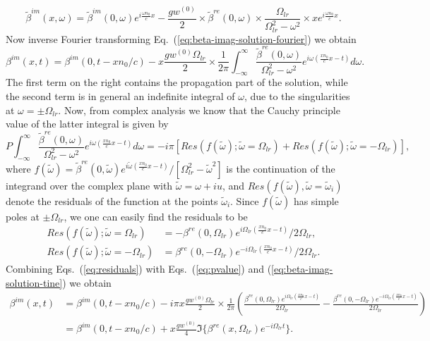 \documentclass[onecolumn,secnumarabic,amssymb, nobibnotes, aip, prd]{revtex4-1}
\def\t{\tilde}
\def\om{\omega}
\begin{document}
\begin{equation}
\label{eq:beta-imag-solution-fourier}
\t\beta^{im}(x,\om) = \t\beta^{im}(0,\om)e^{i\frac{\om n_0}{c}x} -\frac{g w^{(0)} }{2}\times  \t\beta^{re}(0,\om) \times\frac{\Omega_{lr}}{\Omega_{lr}^2-\om^2}\times x e^{i\frac{\om n_0}{c}x}.
\end{equation}
Now inverse Fourier transforming Eq.~(\ref{eq:beta-imag-solution-fourier}) we obtain
\begin{equation}
\label{eq:beta-imag-solution-tine}
\beta^{im}(x,t) = \beta^{im}(0,t-xn_0/c)  -x\frac{g w^{(0)} \Omega_{lr} }{2}\times \frac{1}{2\pi} \int_{-\infty}^{\infty} \frac{\t\beta^{re}(0,\om)}{\Omega_{lr}^2-\om^2} e^{i\om(\frac{x n_0}{c}x-t)}d\omega.
\end{equation}
The first term on the right contains the propagation part of the solution, while the second term is in general an indefinite integral of $\omega$, due to the singularities at $\omega = \pm \Omega_{lr}$. Now, from complex analysis we know that the Cauchy principle value of the latter integral is given by
\begin{equation}
\label{eq:pvalue}
P \int_{-\infty}^{\infty} \frac{\t\beta^{re}(0,\om)}{\Omega_{lr}^2-\om^2} e^{i\om(\frac{x n_0}{c}x-t)}d\omega = -i\pi \left[Res(f(\tilde\omega);\tilde\omega=\Omega_{lr})+Res(f(\tilde\omega);\tilde\omega=-\Omega_{lr})\right],
\end{equation}
where $f(\tilde\omega) = \t\beta^{re}(0,\tilde\omega) e^{i\tilde\omega(\frac{x n_0}{c}x-t)}/[\Omega_{lr}^2-\tilde\omega^2]$ is the continuation of the integrand over the complex plane with $\tilde\omega = \omega + iu$, and $Res(f(\tilde{\omega}),\tilde\omega=\tilde\omega_i)$ denote the residuals of the function at the points $\tilde\omega_i$. Since $f(\tilde\omega)$ has simple poles at $\pm\Omega_{lr}$, we one can easily find the residuals to be 
\begin{subequations}
\label{eq:residuals}
\begin{align}
Res(f(\tilde{\omega});\tilde{\omega}=\Omega_{lr}) &= - \beta^{re}(0,\Omega_{lr})e^{i\Omega_{lr}(\frac{x n_0}{c}x-t)}/2\Omega_{lr}, \\
Res(f(\tilde{\omega});\tilde{\omega}=-\Omega_{lr}) &= \beta^{re}(0,-\Omega_{lr})e^{-i\Omega_{lr}(\frac{x n_0}{c}x-t)}/2\Omega_{lr}.
\end{align}
\end{subequations}
Combining Eqs.~(\ref{eq:residuals}) with Eqs.~(\ref{eq:pvalue}) and (\ref{eq:beta-imag-solution-tine}) we obtain
\begin{subequations}
	\begin{align}
	\beta^{im}(x,t) &= \beta^{im}(0,t-xn_0/c)  -i\pi x\frac{g w^{(0)} \Omega_{lr} }{2}\times  \frac{1}{2\pi} \left( \frac{\beta^{re}(0,\Omega_{lr})e^{i\Omega_{lr}(\frac{x n_0}{c}x-t)}}{2\Omega_{lr}}-\frac{\beta^{re}(0,-\Omega_{lr})e^{-i\Omega_{lr}(\frac{x n_0}{c}x-t)}}{2\Omega_{lr}} \right) \nonumber \\
	&= \beta^{im}(0,t-xn_0/c)+ x\frac{g w^{(0)}}{4}\Im\{ \beta^{re}(x,\Omega_{lr})e^{-i\Omega_{lr}t}\}. 
	\end{align}
\end{subequations}
\end{document}

